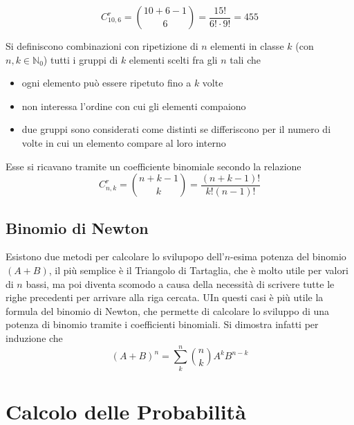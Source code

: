 \documentclass{article}     %
\begin{document}
\begin{ex}
            \[C^r_{10,6}=\binom{10+6-1}{6}=\frac{15!}{6!\cdot9!}=455\]
        \end{ex} 
            \begin{boxdef}  
                Si definiscono combinazioni con ripetizione di $n$ elementi in classe $k$ (con $n,k\in \mathbb{N}_0$) tutti i gruppi di $k$ elementi scelti fra gli $n$ tali che 
                \begin{itemize}
                    \item ogni elemento può essere ripetuto fino a $k$ volte
                    \item non interessa l'ordine con cui gli elementi compaiono
                    \item due gruppi sono considerati come distinti se differiscono per il numero di volte in cui un elemento compare al loro interno
                \end{itemize}
            \end{boxdef}
            Esse si ricavano tramite un coefficiente binomiale secondo la relazione \[C_{n,k}^r=\binom{n+k-1}{k}=\frac{(n+k-1)!}{k!(n-1)!}\]

        \subsection{Binomio di Newton}
            Esistono due metodi per calcolare lo svilupopo dell'$n$-esima potenza del binomio $(A+B)$, il più semplice è il Triangolo di Tartaglia, che è molto utile per valori di $n$ bassi, ma poi diventa scomodo a causa della necessità di scrivere tutte le righe precedenti per arrivare alla riga cercata. UIn questi casi è più utile la formula del binomio di Newton, che permette di calcolare lo sviluppo di una potenza di binomio tramite i coefficienti binomiali. Si dimostra infatti per induzione che 
            \[(A+B)^n=\sum_k^n\binom{n}{k}A^kB^{n-k}\]
    \section{Calcolo delle Probabilità}
\end{document}
